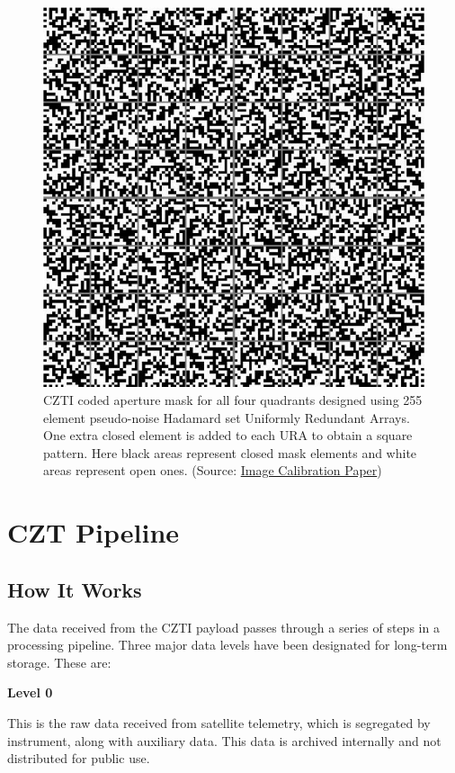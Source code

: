 \documentclass[11pt]{book} %
\begin{document}
\begin{figure}[H]
    \centering
    \includegraphics[scale=0.69]{Pictures/CAM-czti.png}
    \caption{CZTI coded aperture mask for all four quadrants designed using 255 element pseudo-noise Hadamard
    set Uniformly Redundant Arrays. One extra closed element is added to each URA to obtain a square pattern. Here
    black areas represent closed mask elements and white areas represent open ones. (Source: \href{https://arxiv.org/pdf/2108.06746.pdf}{Image Calibration Paper})}
\end{figure}

\clearpage

\section{CZT Pipeline}

\subsection{How It Works}
The data received from the CZTI payload passes through a series of steps in a processing
pipeline. Three major data levels have been designated for long-term storage. These are:

\noindent\textbf{Level 0}

This is the raw data received from satellite telemetry, which is segregated by instrument,
along with auxiliary data. This data is archived internally and not distributed for public
use.
\end{document}
